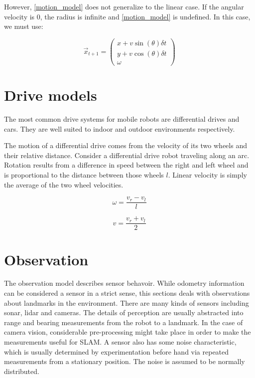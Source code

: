 \documentclass[12pt]{report}
\begin{document}
However, \ref{motion_model} does not generalize to the linear case. If
the angular velocity is 0, the radius is infinite and
\ref{motion_model} is undefined. In this case, we must use:

\begin{equation}
\label{motion_linear}
\vec{x}_{t+1} =
\begin{pmatrix}
 x + v \sin (\theta) \delta t\\
 y + v \cos (\theta) \delta t\\
 \omega
\end{pmatrix}
\end{equation}

\section{Drive models}
The most common drive systems for mobile robots are differential
drives and cars. They are well suited to indoor and outdoor
environments respectively.

The motion of a differential drive comes from the velocity of its two
wheels and their relative distance.  Consider a differential drive
robot traveling along an arc.  Rotation results from a difference in
speed between the right and left wheel and is proportional to the
distance between those wheels $l$.  Linear velocity is simply the
average of the two wheel velocities. \cite{Dudek}

\begin{equation}
\label{differential_drive_rotation}
\omega = \frac{v_r - v_l}{l}
\end{equation}

\begin{equation}
\label{differential_drive_velocity}
v = \frac{v_r + v_l}{2}
\end{equation}


\section{Observation}
The observation model describes sensor behavoir. While odometry
information can be considered a sensor in a strict sense, this
sections deals with observations about landmarks in the environment.
There are many kinds of sensors including sonar, lidar and
cameras. The details of perception are usually abstracted into range
and bearing measurements from the robot to a landmark. In the case of
camera vision, considerable pre-processing might take place in order
to make the measurements useful for SLAM. A sensor also has some noise
characteristic, which is usually determined by experimentation before
hand via repeated measurements from a stationary position. The noise
is assumed to be normally distributed.
\end{document}
